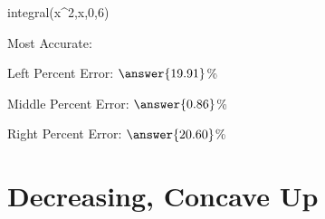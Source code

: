 \documentclass{ximera}
\begin{document}
\begin{question}
\begin{onlineOnly}
\begin{sageCell}
integral(x^2,x,0,6)
\end{sageCell}
\end{onlineOnly}

Most Accurate:
\begin{multipleChoice}
\end{multipleChoice}
Left Percent Error: $\answer{19.91}$\%

Middle Percent Error: $\answer{0.86}$\%

Right Percent Error: $\answer{20.60}$\%
\end{question}

\section{Decreasing, Concave Up}
\end{document}
